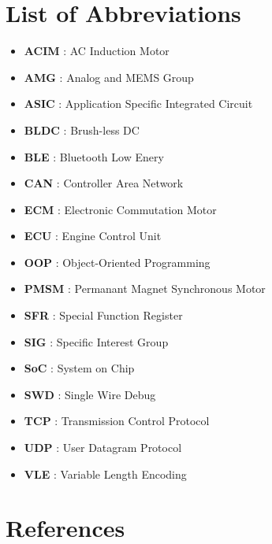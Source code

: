 \documentclass[]{book}
\providecommand{\tightlist}{%
  \setlength{\itemsep}{0pt}\setlength{\parskip}{0pt}}
\begin{document}
\chapter{List of Abbreviations}\label{list-of-abbreviations}

\begin{itemize}
\tightlist
\item
  \textbf{ACIM }: AC Induction Motor
\item
  \textbf{AMG }: Analog and MEMS Group
\item
  \textbf{ASIC }: Application Specific Integrated Circuit
\item
  \textbf{BLDC }: Brush-less DC
\item
  \textbf{BLE }: Bluetooth Low Enery
\item
  \textbf{CAN }: Controller Area Network
\item
  \textbf{ECM }: Electronic Commutation Motor
\item
  \textbf{ECU }: Engine Control Unit
\item
  \textbf{OOP }: Object-Oriented Programming
\item
  \textbf{PMSM }: Permanant Magnet Synchronous Motor
\item
  \textbf{SFR }: Special Function Register
\item
  \textbf{SIG }: Specific Interest Group
\item
  \textbf{SoC }: System on Chip
\item
  \textbf{SWD }: Single Wire Debug
\item
  \textbf{TCP }: Transmission Control Protocol
\item
  \textbf{UDP }: User Datagram Protocol
\item
  \textbf{VLE }: Variable Length Encoding
\end{itemize}

\chapter{References}\label{references}
\end{document}
